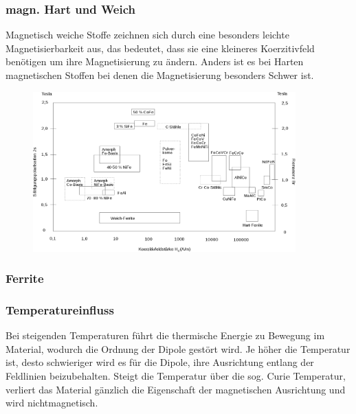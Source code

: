         \subsubsection*{magn. Hart und Weich}
            Magnetisch weiche Stoffe zeichnen sich durch eine besonders leichte Magnetisierbarkeit aus, das bedeutet,
            dass sie eine kleineres Koerzitivfeld benötigen um ihre Magnetisierung zu ändern. Anders ist es bei Harten
            magnetischen Stoffen bei denen die Magnetisierung besonders Schwer ist.
            \begin{figure}[H]
                \centering
                \includegraphics[width=0.9\textwidth]{Images/übersicht_Koerzitivfeldstärke.png}
            \end{figure}
        \subsubsection*{Ferrite}

        \subsubsection*{Temperatureinfluss}
            Bei steigenden Temperaturen führt die thermische Energie zu Bewegung im Material, wodurch die Ordnung der
            Dipole gestört wird. Je höher die Temperatur ist, desto schwieriger wird es für die Dipole, ihre Ausrichtung entlang
            der Feldlinien beizubehalten. Steigt die Temperatur über die sog. Curie Temperatur, verliert das Material gänzlich
            die Eigenschaft der magnetischen Ausrichtung und wird nichtmagnetisch.
